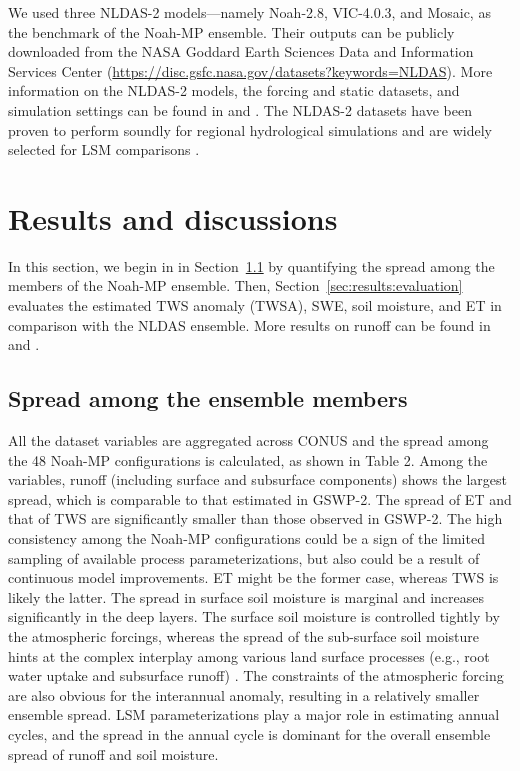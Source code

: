 \documentclass[essd, manuscript]{copernicus}
\begin{document}
We used three NLDAS-2 models---namely Noah-2.8, VIC-4.0.3, and Mosaic, as the benchmark of the Noah-MP ensemble. Their outputs can be publicly downloaded from the NASA Goddard Earth Sciences Data and Information Services Center (\url{https://disc.gsfc.nasa.gov/datasets?keywords=NLDAS}). More information on the NLDAS-2 models, the forcing and static datasets, and simulation settings can be found in \citet{xia2012JGRA, xia2012JGRAa} and \citet[Section 2.1]{fei2021WRR}. The NLDAS-2 datasets have been proven to perform soundly for regional hydrological simulations \citep{xia2012JGRA, xia2012JGRAa, xia2016JGRA, xia2015JHa, xia2015JH} and are widely selected for LSM comparisons \citep{cai2014JGRAa, fei2021WRR}.

\section{Results and discussions}\label{sec:results}

In this section, we begin in in Section~\ref{sec:results:spread} by quantifying the spread among the members of the Noah-MP ensemble. Then, Section~\ref{sec:results:evaluation} evaluates the estimated TWS anomaly (TWSA), SWE, soil moisture, and ET in comparison with the NLDAS ensemble. More results on runoff can be found in \citet{zheng2020JAMES} and \citet{fei2021WRR}.

\subsection{Spread among the ensemble members}\label{sec:results:spread}

All the dataset variables are aggregated across CONUS and the spread among the 48 Noah-MP configurations is calculated, as shown in Table 2. Among the variables, runoff (including surface and subsurface components) shows the largest spread, which is comparable to that estimated in GSWP-2. The spread of ET and that of TWS are significantly smaller than those observed in GSWP-2. The high consistency among the Noah-MP configurations could be a sign of the limited sampling of available process parameterizations, but also could be a result of continuous model improvements. ET might be the former case, whereas TWS is likely the latter. The spread in surface soil moisture is marginal and increases significantly in the deep layers. The surface soil moisture is controlled tightly by the atmospheric forcings, whereas the spread of the sub-surface soil moisture hints at the complex interplay among various land surface processes (e.g., root water uptake and subsurface runoff) \citep{koster2015BAMS}. The constraints of the atmospheric forcing are also obvious for the interannual anomaly, resulting in a relatively smaller ensemble spread. LSM parameterizations play a major role in estimating annual cycles, and the spread in the annual cycle is dominant for the overall ensemble spread of runoff and soil moisture.
\end{document}
